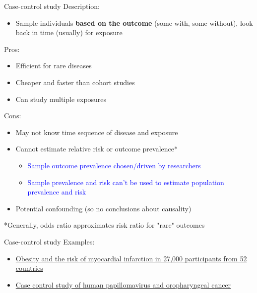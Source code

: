 \documentclass[10pt,t]{beamer}
\begin{document}
\begin{frame}{Case-control study}
	\vspace{-5 mm}
Description:
\begin{itemize}
	\item Sample individuals \textbf{based on the outcome} (some with, some without), look back in time (usually) for exposure
\end{itemize}
Pros:
\begin{itemize}
	\item Efficient for rare diseases
	\item Cheaper and faster than cohort studies
	\item Can study multiple exposures
\end{itemize}
Cons:
\begin{itemize}
	\item May not know time sequence of disease and exposure
	\item Cannot estimate relative risk or outcome prevalence*
\begin{itemize}
\item \textcolor{blue}{Sample outcome prevalence chosen/driven by researchers}
\item \textcolor{blue}{Sample prevalence and risk can't be used to estimate population prevalence and risk}
	\end{itemize}	
	\item Potential confounding (so no conclusions about causality)
\end{itemize}
\medskip
*Generally, odds ratio approximates risk ratio for "rare" outcomes
\end{frame}



\begin{frame}[c]{Case-control study}
Examples:
\vspace{0.3cm}

\begin{itemize}
	\item \href{https://www.sciencedirect.com/science/article/pii/S0140673605676635}{\color{cyan}Obesity and the risk of myocardial infarction in 27,000 participants from 52 countries}
	\item \href{http://www.nejm.org/doi/full/10.1056/NEJMoa065497\#t=article}{\color{cyan}Case control study of human papillomavirus and oropharyngeal cancer}
\end{itemize}

\end{frame}
\end{document}
